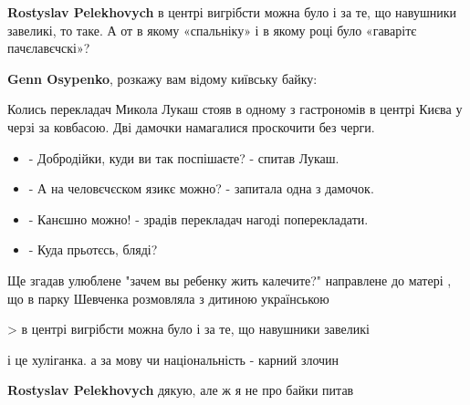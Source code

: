 \begin{itemize}
\begin{itemize}
 
\textbf{Rostyslav Pelekhovych} в центрі вигрібсти можна було і за те, що навушники завеликі, то таке. А от в якому «спальніку» і в якому році було «гаварітє пачєлавєчскі»?

 
\textbf{Genn Osypenko}, розкажу вам відому київську байку:

Колись перекладач Микола Лукаш стояв в одному з гастрономів в центрі Києва у
черзі за ковбасою. Дві дамочки намагалися проскочити без черги.

\begin{itemize}
  \item - Добродійки, куди ви так поспішаєте? - спитав Лукаш.
  \item - А на человєчєском язикє можно? - запитала одна з дамочок.
  \item - Канєшно можно! - зрадів перекладач нагоді поперекладати.
  \item - Куда прьотєсь, бляді?
\end{itemize}

Ще згадав улюблене "зачем вы ребенку жить калечите?" направлене до матері , що
в парку Шевченка розмовляла з дитиною українською

> в центрі вигрібсти можна було і за те, що навушники завеликі

і це хуліганка. а за мову чи національність - карний злочин


 
\textbf{Rostyslav Pelekhovych} дякую, але ж я не про байки питав \Smiley[1.0][yellow]

 

\end{itemize}
\end{itemize}
